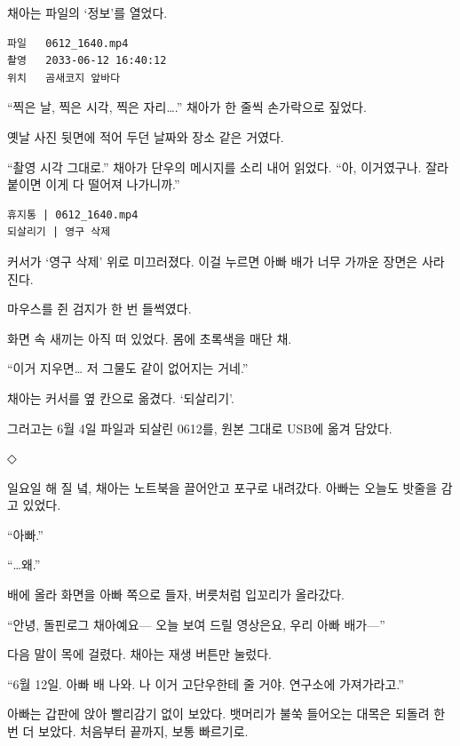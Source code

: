 \documentclass[
  korean,
  letterpaper,
  twoside,
  open=any,
  fontsize=12.5pt,
  headings=small]{scrbook}
\newcommand{\logfont}{\linespread{1}\fontsize{10.8}{15.2}\selectfont}
\begin{document}
채아는 파일의 `정보'를 열었다.

\begin{Verbatim}[samepage=true,frame=single,framesep=2.5mm,rulecolor=\color{gray},formatcom=\logfont]
파일   0612_1640.mp4
촬영   2033-06-12 16:40:12
위치   곰새코지 앞바다
\end{Verbatim}

``찍은 날, 찍은 시각, 찍은
자리\ldots.'' 채아가 한 줄씩
손가락으로 짚었다.

옛날 사진 뒷면에 적어 두던
날짜와 장소 같은 거였다.

``촬영 시각 그대로.'' 채아가
단우의 메시지를 소리 내어
읽었다. ``아, 이거였구나. 잘라
붙이면 이게 다 떨어져
나가니까.''

\begin{Verbatim}[samepage=true,frame=single,framesep=2.5mm,rulecolor=\color{gray},formatcom=\logfont]
휴지통 | 0612_1640.mp4
되살리기 | 영구 삭제
\end{Verbatim}

커서가 `영구 삭제' 위로
미끄러졌다. 이걸 누르면 아빠
배가 너무 가까운 장면은
사라진다.

마우스를 쥔 검지가 한 번
들썩였다.

화면 속 새끼는 아직 떠 있었다.
몸에 초록색을 매단 채.

``이거 지우면\ldots{} 저
그물도 같이 없어지는 거네.''

채아는 커서를 옆 칸으로
옮겼다. `되살리기'.

그러고는 6월 4일 파일과 되살린
0612를, 원본 그대로 USB에 옮겨
담았다.

\begin{center}◇\end{center}\nopagebreak

일요일 해 질 녘, 채아는
노트북을 끌어안고 포구로
내려갔다. 아빠는 오늘도 밧줄을
감고 있었다.

``아빠.''

``\ldots 왜.''

배에 올라 화면을 아빠 쪽으로
들자, 버릇처럼 입꼬리가
올라갔다.

``안녕, 돌핀로그 채아예요---
오늘 보여 드릴 영상은요, 우리
아빠 배가---''

다음 말이 목에 걸렸다. 채아는
재생 버튼만 눌렀다.

``6월 12일. 아빠 배 나와. 나
이거 고단우한테 줄 거야.
연구소에 가져가라고.''

아빠는 갑판에 앉아 빨리감기
없이 보았다. 뱃머리가 불쑥
들어오는 대목은 되돌려 한 번
더 보았다. 처음부터 끝까지,
보통 빠르기로.
\end{document}
